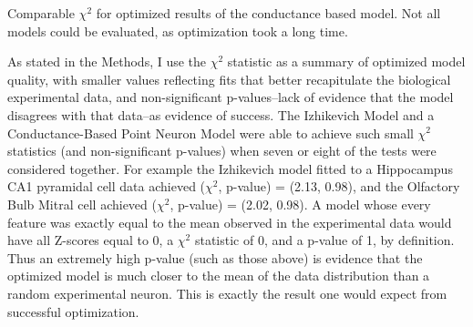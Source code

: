 \begin{table}
\caption[Comparable $\chi^{2}$ for optimized results of AdEx and Izhikevich models]{Comparable $\chi^{2}$ for optimized results of the conductance based model. Not all models could be evaluated, as optimization took a long time.}

\label{tab:main_chi2}

\end{table}

\begin{table}
\caption[$\chi^{2}$ for Comparing Optimized Results of the Conductance Based Model]{Not all models could be evaluated as optimization took a long time or lead to failure. Of the 12 model test combinations only 6 are known.}
\label{tab:HH_chi2}
\end{table}



As stated in the Methods, I use the $\chi^2$ statistic as a summary of optimized model quality, with smaller values reflecting fits that better recapitulate the biological experimental data, and non-significant p-values--lack of evidence that the model disagrees with that data--as evidence of success.
The Izhikevich Model and a Conductance-Based Point Neuron Model were able to achieve such small $\chi^2$ statistics (and non-significant p-values) when seven or eight of the tests were considered together.
For example the Izhikevich model fitted to a Hippocampus CA1 pyramidal cell data achieved ($\chi^2$, p-value) = (2.13, 0.98), and the Olfactory Bulb Mitral cell achieved ($\chi^2$, p-value) = (2.02, 0.98).
A model whose every feature was exactly equal to the mean observed in the experimental data would have all Z-scores equal to 0, a $\chi^2$ statistic of 0, and a p-value of 1, by definition.
Thus an extremely high p-value (such as those above) is evidence that the optimized model is much closer to the mean of the data distribution than a random experimental neuron.
This is exactly the result one would expect from successful optimization.

